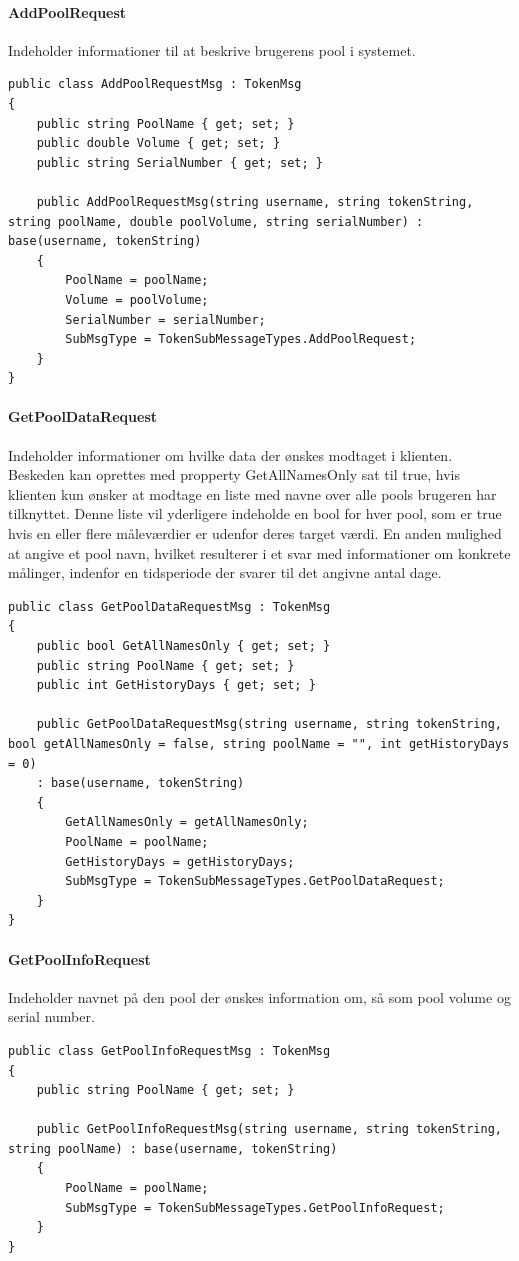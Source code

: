 \paragraph{AddPoolRequest}
Indeholder informationer til at beskrive brugerens pool i systemet.
\begin{lstlisting}[caption=AddPoolRequest, label=code:AddPoolRequest]
public class AddPoolRequestMsg : TokenMsg
{
	public string PoolName { get; set; }
	public double Volume { get; set; }
	public string SerialNumber { get; set; }
	
	public AddPoolRequestMsg(string username, string tokenString, string poolName, double poolVolume, string serialNumber) : base(username, tokenString)
	{
		PoolName = poolName;
		Volume = poolVolume;
		SerialNumber = serialNumber;
		SubMsgType = TokenSubMessageTypes.AddPoolRequest;
	}
}
\end{lstlisting}

\paragraph{GetPoolDataRequest}
Indeholder informationer om hvilke data der ønskes modtaget i klienten. Beskeden kan oprettes med propperty GetAllNamesOnly sat til true, hvis klienten kun ønsker at modtage en liste med navne over alle pools brugeren har tilknyttet. Denne liste vil yderligere indeholde en bool for hver pool, som er true hvis en eller flere måleværdier er udenfor deres target værdi. En anden mulighed at angive et pool navn, hvilket resulterer i et svar med informationer om konkrete målinger, indenfor en tidsperiode der svarer til det angivne antal dage.
\begin{lstlisting}[caption=GetPoolDataRequest, label=code:GetPoolDataRequest]
public class GetPoolDataRequestMsg : TokenMsg
{
	public bool GetAllNamesOnly { get; set; }
	public string PoolName { get; set; }
	public int GetHistoryDays { get; set; }
	
	public GetPoolDataRequestMsg(string username, string tokenString, bool getAllNamesOnly = false, string poolName = "", int getHistoryDays = 0)
	: base(username, tokenString)
	{
		GetAllNamesOnly = getAllNamesOnly;
		PoolName = poolName;
		GetHistoryDays = getHistoryDays;
		SubMsgType = TokenSubMessageTypes.GetPoolDataRequest;
	}
}
\end{lstlisting}

\paragraph{GetPoolInfoRequest}
Indeholder navnet på den pool der ønskes information om, så som pool volume og serial number.
\begin{lstlisting}[caption=GetPoolInfoRequest, label=code:GetPoolInfoRequest]
public class GetPoolInfoRequestMsg : TokenMsg
{
	public string PoolName { get; set; }
	
	public GetPoolInfoRequestMsg(string username, string tokenString, string poolName) : base(username, tokenString)
	{
		PoolName = poolName;
		SubMsgType = TokenSubMessageTypes.GetPoolInfoRequest;
	}
}
\end{lstlisting}

